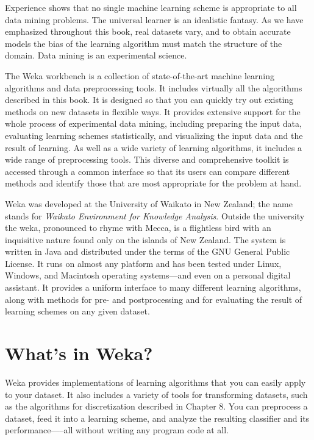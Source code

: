 Experience shows that no single machine learning scheme is appropriate
to all data mining problems. The universal learner is an idealistic
fantasy. As we have emphasized throughout this book, real datasets
vary, and to obtain accurate models the bias of the learning algorithm
must match the structure of the domain. Data mining is an experimental
science.

The Weka workbench is a collection of state-of-the-art machine
learning algorithms and data preprocessing tools. It includes
virtually all the algorithms described in this book. It is designed so
that you can quickly try out existing methods on new datasets in
flexible ways. It provides extensive support for the whole process of
experimental data mining, including preparing the input data,
evaluating learning schemes statistically, and visualizing the input
data and the result of learning. As well as a wide variety of learning
algorithms, it includes a wide range of preprocessing tools. This
diverse and comprehensive toolkit is accessed through a common
interface so that its users can compare different methods and identify
those that are most appropriate for the problem at hand.

Weka was developed at the University of Waikato in New Zealand; the
name stands for \textit{Waikato Environment for Knowledge
Analysis}. Outside the university the weka, pronounced to rhyme with
Mecca, is a flightless bird with an inquisitive nature found only on
the islands of New Zealand. The system is written in Java and
distributed under the terms of the GNU General Public License. It runs
on almost any platform and has been tested under Linux, Windows, and
Macintosh operating systems—and even on a personal digital
assistant. It provides a uniform interface to many different learning
algorithms, along with methods for pre- and postprocessing and for
evaluating the result of learning schemes on any given dataset.

\section{What's in Weka?}

Weka provides implementations of learning algorithms that you can
easily apply to your dataset. It also includes a variety of tools for
transforming datasets, such as the algorithms for discretization
described in Chapter 8. You can preprocess a dataset, feed it into a
learning scheme, and analyze the resulting classifier and its
performance—--all without writing any program code at all.

